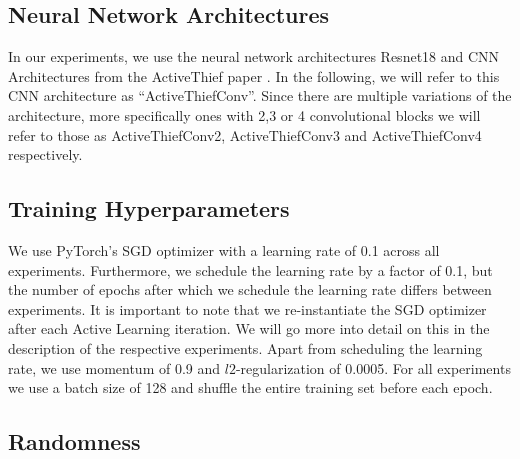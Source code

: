 \subsection{Neural Network Architectures}
\label{sec:ExperimentSetup:NNArchitectures}
In our experiments, we use the neural network architectures Resnet18 \cite{he2016deep} and CNN Architectures from the ActiveThief paper \cite{pal2020activethief}.
In the following, we will refer to this CNN architecture as \enquote{ActiveThiefConv}. Since there are multiple variations of the architecture, more specifically ones with
2,3 or 4 convolutional blocks we will refer to those as ActiveThiefConv2, ActiveThiefConv3 and ActiveThiefConv4 respectively.


\subsection{Training Hyperparameters}
\label{sec:ExperimentSetup:Hyperparameters}
We use PyTorch's SGD optimizer with a learning rate of 0.1 across all experiments. Furthermore, we schedule the learning rate by a factor of 0.1, but the number of
epochs after which we schedule the learning rate differs between experiments. It is important to note that we re-instantiate the SGD optimizer after each Active Learning
iteration. We will go more into detail on this in the description of the respective experiments. Apart from scheduling the learning rate, we use momentum \cite{cutkosky2020momentum}
of 0.9 and $l2$-regularization of 0.0005. For all experiments we use a batch size of 128 and shuffle the entire training set before each epoch.

\subsection{Randomness}
\label{sec:ExperimentSetup:Randomness}

